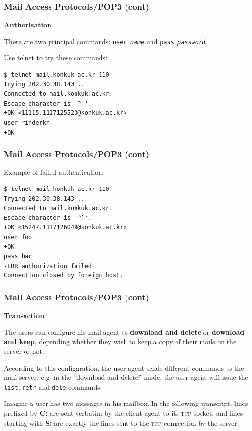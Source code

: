 %
\begin{frame}[containsverbatim]
\frametitle{Mail Access Protocols/POP3 (cont)}

\textbf{Authorisation}

There are two principal commands: \texttt{user \emph{name}} and
\texttt{pass \emph{password}}.

Use \textsf{telnet} to try these commands:

{\small
\begin{verbatim}
$ telnet mail.konkuk.ac.kr 110
Trying 202.30.38.143...
Connected to mail.konkuk.ac.kr.
Escape character is '^]'.
+OK <11115.1117125523@konkuk.ac.kr>
user rinderkn
+OK
\end{verbatim}
}

\end{frame}

%
\begin{frame}[containsverbatim]
\frametitle{Mail Access Protocols/POP3 (cont)}

Example of failed authentication:
{\small
\begin{verbatim}
$ telnet mail.konkuk.ac.kr 110
Trying 202.30.38.143...
Connected to mail.konkuk.ac.kr.
Escape character is '^]'.
+OK <15247.1117126049@konkuk.ac.kr>
user foo
+OK
pass bar
-ERR authorization failed
Connection closed by foreign host.
\end{verbatim}
}

\end{frame}

%
\begin{frame}
\frametitle{Mail Access Protocols/POP3 (cont)}

\textbf{Transaction}

The users can configure his mail agent to \textbf{download and delete}
or \textbf{download and keep}, depending whether they wish to keep a
copy of their mails on the server or not.

According to this configuration, the user agent sends different
commands to the mail server, e.g. in the ``download and delete'' mode,
the user agent will issue the \texttt{list}, \texttt{retr} and
\texttt{dele} commands.

Imagine a user has two messages in his mailbox. In the following
transcript, lines prefixed by \textbf{C:} are sent verbatim by the
client agent to its \textsc{tcp} socket, and lines starting with
\textbf{S:} are exactly the lines sent to the \textsc{tcp} connection
by the server.

\end{frame}


